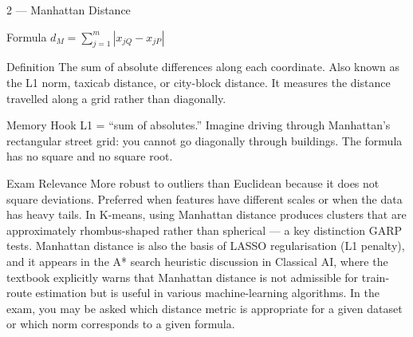 \documentclass[aspectratio=169,8pt]{beamer}
\begin{document}
	\begin{frame}{2 --- Manhattan Distance}
		\begin{block}{Formula}
			$d_M = \sum_{j=1}^{m}|x_{jQ} - x_{jP}|$
		\end{block}
		\begin{block}{Definition}
			The sum of absolute differences along each coordinate. Also known as the L1 norm, taxicab distance, or city-block distance. It measures the distance travelled along a grid rather than diagonally.
		\end{block}
		\begin{block}{Memory Hook}
			L1 = ``sum of absolutes.'' Imagine driving through Manhattan's rectangular street grid: you cannot go diagonally through buildings. The formula has no square and no square root.
		\end{block}
		\begin{block}{Exam Relevance}
			More robust to outliers than Euclidean because it does not square deviations. Preferred when features have different scales or when the data has heavy tails. In K-means, using Manhattan distance produces clusters that are approximately rhombus-shaped rather than spherical --- a key distinction GARP tests. Manhattan distance is also the basis of LASSO regularisation (L1 penalty), and it appears in the A* search heuristic discussion in Classical AI, where the textbook explicitly warns that Manhattan distance is not admissible for train-route estimation but is useful in various machine-learning algorithms. In the exam, you may be asked which distance metric is appropriate for a given dataset or which norm corresponds to a given formula.
		\end{block}
	\end{frame}
	
\end{document}
